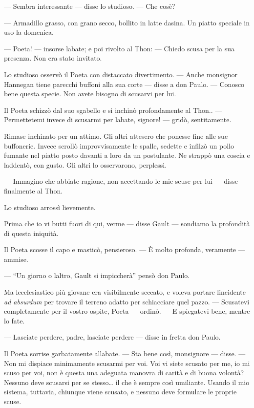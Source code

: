 --- Sembra interessante --- disse lo studioso. --- Che
cos\textquotesingle è?

--- Armadillo grasso, con grano secco, bollito in latte
d\textquotesingle asina. Un piatto speciale in uso la domenica.

--- Poeta! --- insorse l\textquotesingle abate; e poi rivolto al Thon:
--- Chiedo scusa per la sua presenza. Non era stato invitato.

Lo studioso osservò il Poeta con distaccato divertimento. --- Anche
monsignor Hannegan tiene parecchi buffoni alla sua corte --- disse a don
Paulo. --- Conosco bene questa specie. Non avete bisogno di scusarvi per
lui.

Il Poeta schizzò dal suo sgabello e si inchinò profondamente al Thon..
--- Permettetemi invece di scusarmi per l\textquotesingle abate,
signore! --- gridò, sentitamente.

Rimase inchinato per un attimo. Gli altri attesero che ponesse fine alle
sue buffonerie. Invece scrollò improvvisamente le spalle, sedette e
infilzò un pollo fumante nel piatto posto davanti a loro da un
postulante. Ne strappò una coscia e l\textquotesingle addentò, con
gusto. Gli altri lo osservarono, perplessi.

--- Immagino che abbiate ragione, non accettando le mie scuse per lui
--- disse finalmente al Thon.

Lo studioso arrossì lievemente.

Prima che io vi butti fuori di qui, verme --- disse Gault --- sondiamo
la profondità di questa iniquità.

Il Poeta scosse il capo e masticò, pensieroso. --- È molto profonda,
veramente --- ammise.

--- ``Un giorno o l\textquotesingle altro, Gault si impiccherà'' pensò
don Paulo.

Ma l\textquotesingle ecclesiastico più giovane era visibilmente seccato,
e voleva portare l\textquotesingle incidente \emph{ad absurdum} per
trovare il terreno adatto per schiacciare quel pazzo. --- Scusatevi
completamente per il vostro ospite, Poeta --- ordinò. --- E spiegatevi
bene, mentre lo fate.

--- Lasciate perdere, padre, lasciate perdere --- disse in fretta don
Paulo.

Il Poeta sorrise garbatamente all\textquotesingle abate. --- Sta bene
così, monsignore --- disse. --- Non mi dispiace minimamente scusarmi per
voi. Voi vi siete scusato per me, io mi scuso per voi, non è questa una
adeguata manovra di carità e di buona volontà? Nessuno deve scusarsi per
se stesso\ldots{} il che è sempre così umiliante. Usando il mio sistema,
tuttavia, chiunque viene scusato, e nessuno deve formulare le proprie
scuse.

